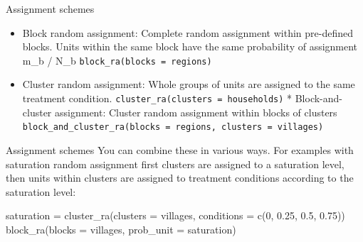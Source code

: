 \documentclass[
  11pt,
  ignorenonframetext,
]{beamer}
\newenvironment{Shaded}{\begin{snugshade}}{\end{snugshade}}
\newcommand{\AttributeTok}[1]{\textcolor[rgb]{0.40,0.45,0.13}{#1}}
\newcommand{\DecValTok}[1]{\textcolor[rgb]{0.68,0.00,0.00}{#1}}
\newcommand{\FloatTok}[1]{\textcolor[rgb]{0.68,0.00,0.00}{#1}}
\newcommand{\FunctionTok}[1]{\textcolor[rgb]{0.28,0.35,0.67}{#1}}
\newcommand{\NormalTok}[1]{\textcolor[rgb]{0.00,0.23,0.31}{#1}}
\newcommand{\OtherTok}[1]{\textcolor[rgb]{0.00,0.23,0.31}{#1}}
\providecommand{\tightlist}{%
  \setlength{\itemsep}{0pt}\setlength{\parskip}{0pt}}\usepackage{longtable,booktabs,array}
\begin{document}
\begin{frame}[fragile]{Assignment schemes}
\protect\hypertarget{assignment-schemes-1}{}
\begin{itemize}
\tightlist
\item
  Block random assignment: Complete random assignment within pre-defined
  blocks. Units within the same block have the same probability of
  assignment m\_b / N\_b \texttt{block\_ra(blocks\ =\ regions)}
\item
  Cluster random assignment: Whole groups of units are assigned to the
  same treatment condition.
  \texttt{cluster\_ra(clusters\ =\ households)} * Block-and-cluster
  assignment: Cluster random assignment within blocks of clusters
  \texttt{block\_and\_cluster\_ra(blocks\ =\ regions,\ clusters\ =\ villages)}
\end{itemize}
\end{frame}

\begin{frame}[fragile]{Assignment schemes}
\protect\hypertarget{assignment-schemes-2}{}
You can combine these in various ways. For examples with saturation
random assignment first clusters are assigned to a saturation level,
then units within clusters are assigned to treatment conditions
according to the saturation level:

\begin{Shaded}
\begin{Highlighting}[]
\NormalTok{saturation }\OtherTok{=} \FunctionTok{cluster\_ra}\NormalTok{(}\AttributeTok{clusters =}\NormalTok{ villages, }\AttributeTok{conditions =} \FunctionTok{c}\NormalTok{(}\DecValTok{0}\NormalTok{, }\FloatTok{0.25}\NormalTok{, }\FloatTok{0.5}\NormalTok{, }\FloatTok{0.75}\NormalTok{))}
\FunctionTok{block\_ra}\NormalTok{(}\AttributeTok{blocks =}\NormalTok{ villages, }\AttributeTok{prob\_unit =}\NormalTok{ saturation)}
\end{Highlighting}
\end{Shaded}
\end{frame}
\end{document}
